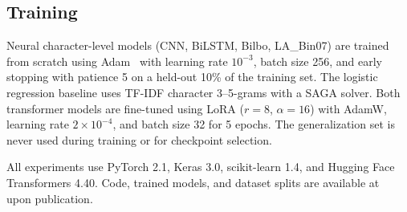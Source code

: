 \documentclass[conference]{IEEEtran}
\begin{document}
\begin{table}[!t]
\caption{Models included in the study. All character-level models use a maximum domain length of 64--75 characters. Inference times are measured per domain on a single CPU thread (Google Colab)~\cite{google_colab}.}
\label{tab:models}
\centering
\renewcommand{\arraystretch}{1.1}
\end{table}

\subsection{Training}

Neural character-level models (CNN, BiLSTM, Bilbo, LA\_Bin07) are trained from scratch using Adam~\cite{kingma2014adam} with learning rate $10^{-3}$, batch size 256, and early stopping with patience 5 on a held-out 10\% of the training set. The logistic regression baseline uses TF-IDF character 3--5-grams with a SAGA solver. Both transformer models are fine-tuned using LoRA ($r=8$, $\alpha=16$) with AdamW, learning rate $2 \times 10^{-4}$, and batch size 32 for 5 epochs. The generalization set is never used during training or for checkpoint selection.

All experiments use PyTorch 2.1, Keras 3.0, scikit-learn 1.4, and Hugging Face Transformers 4.40. Code, trained models, and dataset splits are available at~\cite{reynier_dga_multifamily_benchmark} upon publication.
\end{document}
